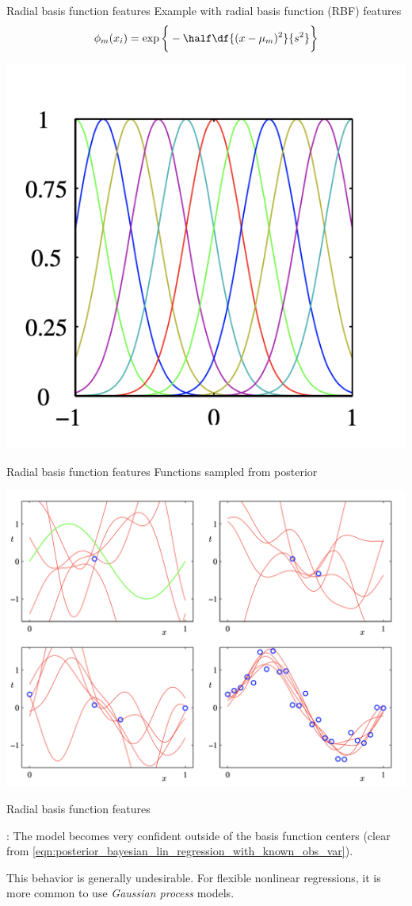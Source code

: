 \documentclass[10pt]{beamer}
\begin{document}
\begin{frame}{Radial basis function features}
Example with radial basis function (RBF) features
\[ \phi_m(x_i) = \exp \bigg\{ -\half \df{(x-\mu_m)^2}{s^2} \bigg\} \] 

\begin{center}
\includegraphics[width=.5\textwidth]{images/bishop_RBF_basis}	
\end{center}

\end{frame}

\begin{frame}{Radial basis function features}
Functions sampled from posterior
\begin{center}
\includegraphics[width=.8\textwidth]{images/bishop_RBF_posterior_samples}	
\end{center}

\end{frame}

\begin{frame}{Radial basis function features}

:  The model becomes very confident outside of the basis function centers {\scriptsize (clear from \eqref{eqn:posterior_bayesian_lin_regression_with_known_obs_var})}.

\vfill 
This behavior is generally undesirable. 
\vfill 
For flexible nonlinear regressions, it is more common to use \textit{Gaussian process} models. 
	
\end{frame}
\end{document}
